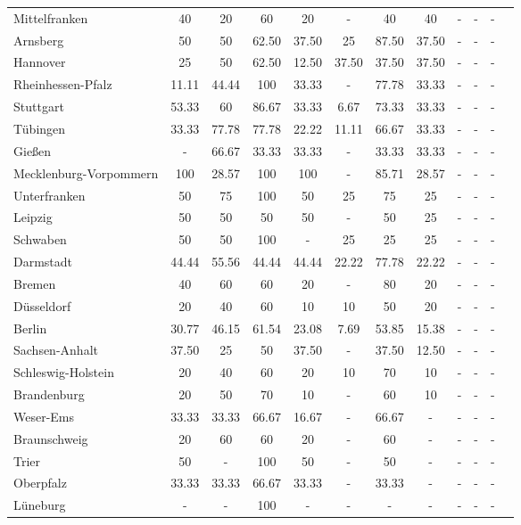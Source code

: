 \begin{table}[H]
\begin{tabularx}{\textwidth}{Xccccccccccc}
            Mittelfranken & 40 & 20 & 60 & 20 & - & 40 & 40 & - & - & - \\
            Arnsberg & 50 & 50 & 62.50 & 37.50 & 25 & 87.50 & 37.50 & - & - & - \\
            Hannover & 25 & 50 & 62.50 & 12.50 & 37.50 & 37.50 & 37.50 & - & - & - \\
            Rheinhessen-Pfalz & 11.11 & 44.44 & 100 & 33.33 & - & 77.78 & 33.33 & - & - & - \\
            Stuttgart & 53.33 & 60 & 86.67 & 33.33 & 6.67 & 73.33 & 33.33 & - & - & - \\
            Tübingen & 33.33 & 77.78 & 77.78 & 22.22 & 11.11 & 66.67 & 33.33 & - & - & - \\
            Gießen & - & 66.67 & 33.33 & 33.33 & - & 33.33 & 33.33 & - & - & - \\
            Mecklenburg-Vorpommern & 100 & 28.57 & 100 & 100 & - & 85.71 & 28.57 & - & - & - \\
            Unterfranken & 50 & 75 & 100 & 50 & 25 & 75 & 25 & - & - & - \\
            Leipzig & 50 & 50 & 50 & 50 & - & 50 & 25 & - & - & - \\
            Schwaben & 50 & 50 & 100 & - & 25 & 25 & 25 & - & - & - \\
            Darmstadt & 44.44 & 55.56 & 44.44 & 44.44 & 22.22 & 77.78 & 22.22 & - & - & - \\
            Bremen & 40 & 60 & 60 & 20 & - & 80 & 20 & - & - & - \\
            Düsseldorf & 20 & 40 & 60 & 10 & 10 & 50 & 20 & - & - & - \\
            Berlin & 30.77 & 46.15 & 61.54 & 23.08 & 7.69 & 53.85 & 15.38 & - & - & - \\
            Sachsen-Anhalt & 37.50 & 25 & 50 & 37.50 & - & 37.50 & 12.50 & - & - & - \\
            Schleswig-Holstein & 20 & 40 & 60 & 20 & 10 & 70 & 10 & - & - & - \\
            Brandenburg & 20 & 50 & 70 & 10 & - & 60 & 10 & - & - & - \\
            Weser-Ems & 33.33 & 33.33 & 66.67 & 16.67 & - & 66.67 & - & - & - & - \\
            Braunschweig & 20 & 60 & 60 & 20 & - & 60 & - & - & - & - \\
            Trier & 50 & - & 100 & 50 & - & 50 & - & - & - & - \\
            Oberpfalz & 33.33 & 33.33 & 66.67 & 33.33 & - & 33.33 & - & - & - & - \\
            Lüneburg & - & - & 100 & - & - & - & - & - & - & - \\
        \bottomrule
    \end{tabularx}
\end{table}
    